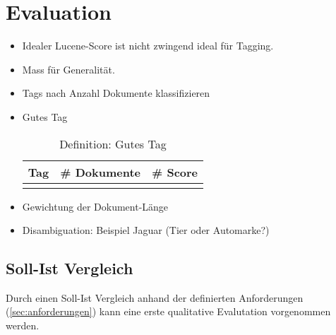 \chapter{Evaluation}




\begin{itemize}
    \item Idealer Lucene-Score ist nicht zwingend ideal für Tagging.
    \item Mass für Generalität.
    \item Tags nach Anzahl Dokumente klassifizieren
    \item Gutes Tag
    
    \begin{longtable}{|p{4cm}| p{4cm}| p{4cm}|}
  \hline
    \textbf{Tag} & \textbf{\# Dokumente}& \textbf{\# Score}\\\hline
        \caption{Definition: Gutes Tag}
    \label{gutes-tag}
\end{longtable}
    \item Gewichtung der Dokument-Länge
    \item Disambiguation: Beispiel Jaguar (Tier oder Automarke?)
    
\end{itemize}


\section{Soll-Ist Vergleich}
Durch einen Soll-Ist Vergleich anhand der definierten Anforderungen (\autoref{sec:anforderungen}) kann eine erste qualitative Evalutation vorgenommen werden.  

